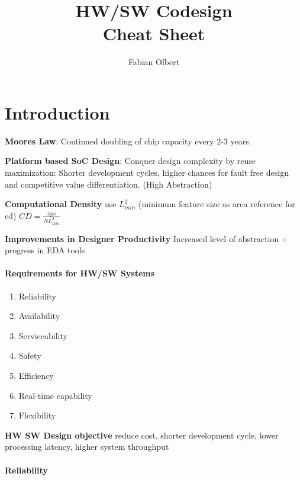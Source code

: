\documentclass[english]{latex4ei/latex4ei_sheet}
\title{HW/SW Codesign \\ Cheat Sheet}
\author{Fabian Olbert}                    %
\begin{document}
\maketitle   %

\section{Introduction}

\textbf{Moores Law}: Continued doubling of chip capacity every 2-3 years.

\textbf{Platform based SoC Design}: Conquer design complexity by reuse maximization: Shorter development cycles, higher chances for fault free design and competitive value differentiation. (High Abstraction)

\textbf{Computational Density} use $L_{min}^2$ (minimum feature size as area reference for cd) $CD = \frac{ops}{N L_{min}^2}$

\textbf{Improvements in Designer Productivity} Increased level of abstraction + progress in EDA tools

\paragraph{Requirements for HW/SW Systems}
\begin{enumerate}
	\item Reliability
	\item Availability
	\item Serviceability
	\item Safety
	\item Efficiency
	\item Real-time capability
	\item Flexibility
\end{enumerate}

\textbf{HW SW Design objective} reduce cost, shorter development cycle, lower processing latency, higher system throughput

\paragraph{Reliability}
\end{document}
